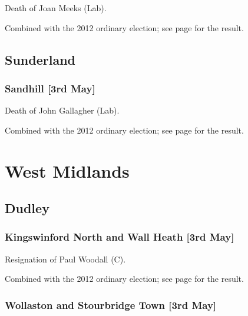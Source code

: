 \documentclass[a4paper,openany]{book}
\begin{document}
\begin{resultsiii}

Death of Joan Meeks (Lab).

Combined with the 2012 ordinary election; see page \pageref{SimonsideRekendykeSouthTyneside} for the result.

\subsection*{Sunderland}

\subsubsection*{Sandhill \hspace*{\fill}\nolinebreak[1]%
\enspace\hspace*{\fill}
[3rd May]}


Death of John Gallagher (Lab).

Combined with the 2012 ordinary election; see page \pageref{SandhillSunderland} for the result.

\section{West Midlands}

\subsection*{Dudley}

\subsubsection*{Kingswinford North and Wall Heath \hspace*{\fill}\nolinebreak[1]%
\enspace\hspace*{\fill}
[3rd May]}


Resignation of Paul Woodall (C).

Combined with the 2012 ordinary election; see page \pageref{KingswinfordNorthWallHeathDudley} for the result.

\subsubsection*{Wollaston and Stourbridge Town \hspace*{\fill}\nolinebreak[1]%
\enspace\hspace*{\fill}
[3rd May]}


\end{resultsiii}
\end{document}
